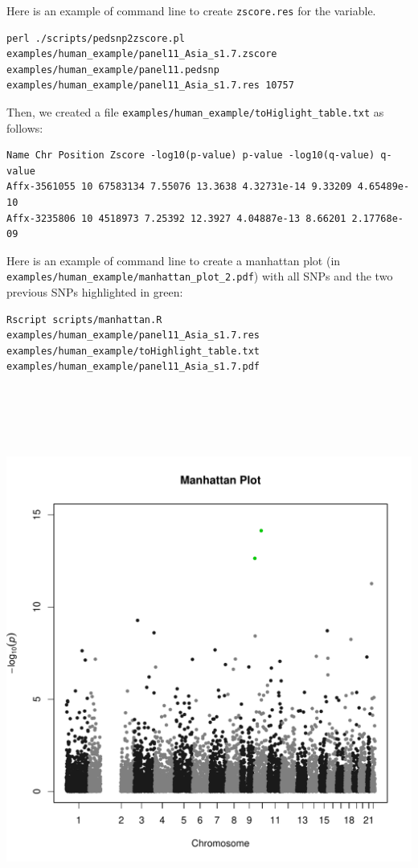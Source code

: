\documentclass[10pt,a4paper]{article}
\begin{document}
\noindent
Here is an example of command line to create \verb|zscore.res| for the variable.
\begin{Verbatim}[frame=single]
 perl ./scripts/pedsnp2zscore.pl examples/human_example/panel11_Asia_s1.7.zscore 
examples/human_example/panel11.pedsnp examples/human_example/panel11_Asia_s1.7.res 10757
\end{Verbatim}
\noindent
Then, we created a file \verb|examples/human_example/toHiglight_table.txt| as follows:
\begin{Verbatim}[frame=single]
Name Chr Position Zscore -log10(p-value) p-value -log10(q-value) q-value
Affx-3561055 10 67583134 7.55076 13.3638 4.32731e-14 9.33209 4.65489e-10
Affx-3235806 10 4518973 7.25392 12.3927 4.04887e-13 8.66201 2.17768e-09
\end{Verbatim}
\noindent
Here is an example of command line to create a manhattan plot (in \verb|examples/human_example/manhattan_plot_2.pdf|) with all SNPs and the two previous SNPs highlighted in green:
\begin{Verbatim}[frame=single]
Rscript scripts/manhattan.R examples/human_example/panel11_Asia_s1.7.res 
examples/human_example/toHighlight_table.txt examples/human_example/panel11_Asia_s1.7.pdf
\end{Verbatim}

\centerline{\includegraphics[width=18cm,height=18cm]{manhattan.pdf}}
\end{document}
